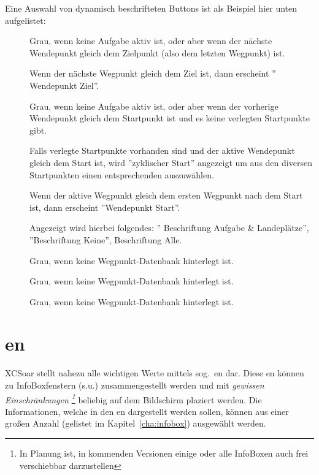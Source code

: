 Eine Auswahl von dynamisch beschrifteten Buttons ist als Beispiel hier unten aufgelistet:

\begin{description}
\item[]
  Grau, wenn keine  Aufgabe aktiv ist, oder aber wenn der nächste Wendepunkt gleich dem Zielpunkt (also dem letzten Wegpunkt) ist.

 Wenn der nächste Wegpunkt gleich dem Ziel ist, dann erscheint '' Wendepunkt Ziel''.
\item[]
  Grau, wenn keine  Aufgabe aktiv ist, oder aber wenn der vorherige Wendepunkt gleich dem Startpunkt ist und es keine verlegten Startpunkte gibt.

  Falls verlegte Startpunkte vorhanden sind und der aktive Wendepunkt gleich dem Start ist, wird ''zyklischer Start'' angezeigt um aus den diversen Startpunkten einen entsprechenden auszuwählen.

Wenn der aktive Wegpunkt gleich dem ersten Wegpunkt nach dem Start ist, dann erscheint  ''Wendepunkt Start''.
\item[]
Angezeigt wird hierbei folgendes: '' Beschriftung Aufgabe \& Landeplätze'', ''Beschriftung Keine'', Beschriftung Alle.

\item[]
\item[]
 Grau,  wenn keine Wegpunkt-Datenbank hinterlegt ist.
 \item[]
  Grau,  wenn keine Wegpunkt-Datenbank hinterlegt ist.
\item[]
  Grau,  wenn keine Wegpunkt-Datenbank hinterlegt ist.
\end{description}

\section{{\InfoBox}en}

\textsf{XCSoar} stellt nahezu alle wichtigen Werte mittels  sog.\  {\InfoBox}en dar. 
Diese {\InfoBox}en können zu InfoBoxfenstern (s.u.) zusammengestellt werden und mit
\emph{gewissen Einschränkungen \footnote{In Planung ist, in kommenden Versionen einige oder alle 
InfoBoxen auch frei verschiebbar darzustellen}} beliebig auf dem Bildschirm plaziert werden. 
Die Informationen, welche in den  {\InfoBox}en dargestellt werden sollen,  können aus einer großen Anzahl (gelistet im Kapitel~\ref{cha:infobox}) ausgewählt werden.

